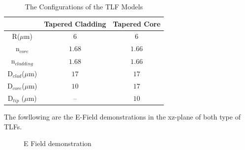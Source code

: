 \begin{table}
\caption{The Configurations of the TLF Models}
\begin{tabular}{ccc}
\hline
							&Tapered Cladding&Tapered Core\\
\hline
R($\mu$m) & $6$						 &$6$	\\
n$_{core}$&$1.68$&$1.66$\\
n$_{cladding}$&$1.68$&$1.66$\\
D$_{clad}$($\mu$m) &	$17$ &	$17$\\
D$_{core}$($\mu$m) & $10$ &	$17$\\
D$_{tip}$ ($\mu$m) & --   &	$10$\\
\hline
\end{tabular}

\label{tab:model_fiber_configuration}
\end{table}
The fowllowing are the E-Field demonstrations in the xz-plane of both type of TLFs.
\begin{figure}
	\hfill
	\caption{E Field demonstration}
\end{figure}



